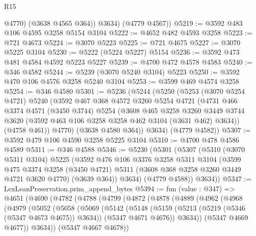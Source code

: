\begin{lexlean}{R15}
\begin{coremodule}
            @4770)
          (@3638 @4565 @364))
        @3634)
      (@4779 @4567))
@5219 := @3592 @483 @106 @4595 @3258 @5154 @3104
@5222 := @4652 @482 @4593 @3258
@5223 := @721 @4673
@5224 := @3070 @5223
@5225 := @721 @4675
@5227 := @3070 @5225 @3104
@5230 := @5222 (@5224 @5227) @5154
@5236 := @3592 @473 @481 @4584 @4592 @5223 @5227
@5239 := @4700 @472 @4578 @4583
@5240 := @346 @4582
@5244 := @5239 (@3070 @5240 @3104) @5223
@5250 := @3592 @470 @106 @4576 @3258 @5240 @3104
@5253 := @3599 @469 @4574 @3258
@5254 := @346 @4580
@5301 := @5236
    (@5244
      (@5250
        (@5253
          (@3070 @5254 @4721)
          @5240
          (@3592
            @467
            @368
            @4572
            @3260
            @5254
            @4721
            (@4731
              @466
              @3374
              @4571
              (@3450 @3744)
              @5254
              (@3608
                @465
                @3258
                @3260
                @3449
                @3744
                @3620
                (@3592 @463 @106 @3258 @3258 @462 @3104 (@3631 @462) @3634))
              (@4758 @461))
            @4770)
          (@3638 @4580 @364))
        @3634)
      (@4779 @4582))
@5307 := @3592 @479 @106 @4590 @3258 @5225 @3104
@5310 := @4700 @478 @4586 @4589
@5311 := @346 @4588
@5346 := @5230
    (@5301
      (@5307
        (@5310
          (@3070 @5311 @3104)
          @5225
          (@3592
            @476
            @106
            @3376
            @3258
            @5311
            @3104
            (@3599
              @475
              @3374
              @3258
              (@3450 @4721)
              @5311
              (@3608 @368 @3258 @3260 @3449 @4721 @3620 @4770)
              (@3639 @364))
            @3634)
          (@4779 @4588))
        @3634))
@5347 := LexLeanPreservation.prim_append_bytes
@5394 := fun (value : @347) =>
  @4651
    (@4690
      (@4782
        (@4788
          (@4799
            (@4872
              (@4878
                (@4889
                  (@4962
                    (@4968
                      (@4979
                        (@5052
                          (@5058
                            (@5069
                              (@5142
                                (@5148
                                  (@5159
                                    (@5213 (@5219 (@5346 (@5347 @4673 @4675)) @3634))
                                    (@5347 @4671 @4676))
                                  @3634))
                              (@5347 @4669 @4677))
                            @3634))
                        (@5347 @4667 @4678))

\end{coremodule}
\end{lexlean}
